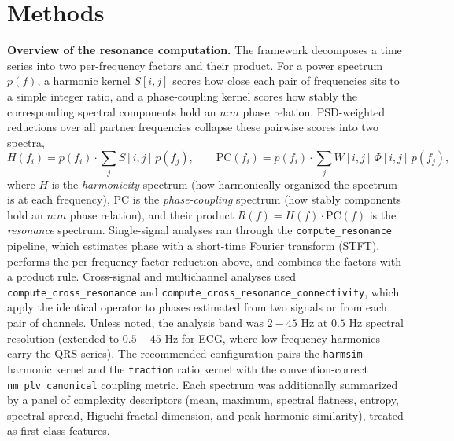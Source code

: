 \documentclass[11pt]{article}
\begin{document}
\section{Methods}
\textbf{Overview of the resonance computation.} The framework decomposes a time series into two per-frequency factors and their product. For a power spectrum $p(f)$, a harmonic kernel $S[i,j]$ scores how close each pair of frequencies sits to a simple integer ratio, and a phase-coupling kernel scores how stably the corresponding spectral components hold an $n$:$m$ phase relation. PSD-weighted reductions over all partner frequencies collapse these pairwise scores into two spectra,
\[
H(f_i) = p(f_i)\cdot\sum_j S[i,j]\,p(f_j),\qquad
\mathrm{PC}(f_i) = p(f_i)\cdot\sum_j W[i,j]\,\Phi[i,j]\,p(f_j),
\]
where $H$ is the \emph{harmonicity} spectrum (how harmonically organized the spectrum is at each frequency), $\mathrm{PC}$ is the \emph{phase-coupling} spectrum (how stably components hold an $n$:$m$ phase relation), and their product $R(f) = H(f)\cdot\mathrm{PC}(f)$ is the \emph{resonance} spectrum. Single-signal analyses ran through the \texttt{compute\_resonance} pipeline, which estimates phase with a short-time Fourier transform (STFT), performs the per-frequency factor reduction above, and combines the factors with a product rule. Cross-signal and multichannel analyses used \texttt{compute\_cross\_resonance} and \texttt{compute\_cross\_resonance\_connectivity}, which apply the identical operator to phases estimated from two signals or from each pair of channels. Unless noted, the analysis band was $2-45$ Hz at $0.5$ Hz spectral resolution (extended to $0.5-45$ Hz for ECG, where low-frequency harmonics carry the QRS series). The recommended configuration pairs the \texttt{harmsim} harmonic kernel and the \texttt{fraction} ratio kernel with the convention-correct \texttt{nm\_plv\_canonical} coupling metric. Each spectrum was additionally summarized by a panel of complexity descriptors (mean, maximum, spectral flatness, entropy, spectral spread, Higuchi fractal dimension, and peak-harmonic-similarity), treated as first-class features.
\end{document}
